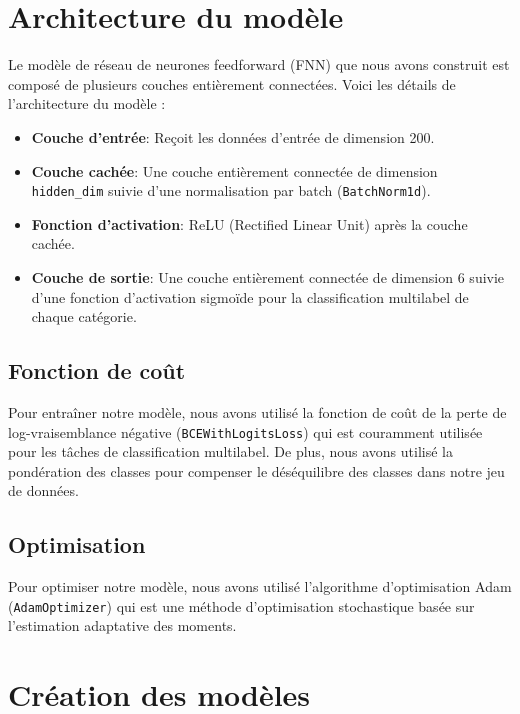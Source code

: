 \section{Architecture du modèle}

Le modèle de réseau de neurones feedforward (FNN) que nous avons construit est composé de plusieurs couches entièrement connectées. Voici les détails de l'architecture du modèle :

\begin{itemize}
    \item \textbf{Couche d'entrée}: Reçoit les données d'entrée de dimension 200.
    \item \textbf{Couche cachée}: Une couche entièrement connectée de dimension \texttt{hidden\_dim} suivie d'une normalisation par batch (\texttt{BatchNorm1d}).
    \item \textbf{Fonction d'activation}: ReLU (Rectified Linear Unit) après la couche cachée.
    \item \textbf{Couche de sortie}: Une couche entièrement connectée de dimension 6 suivie d'une fonction d'activation sigmoïde pour la classification multilabel de chaque catégorie.
\end{itemize}

\subsection{Fonction de coût}

Pour entraîner notre modèle, nous avons utilisé la fonction de coût de la perte de log-vraisemblance négative (\texttt{BCEWithLogitsLoss}) qui est couramment utilisée pour les tâches de classification multilabel.
De plus, nous avons utilisé la pondération des classes pour compenser le déséquilibre des classes dans notre jeu de données.

\subsection{Optimisation}

Pour optimiser notre modèle, nous avons utilisé l'algorithme d'optimisation Adam (\texttt{AdamOptimizer}) qui est une méthode d'optimisation stochastique basée sur l'estimation adaptative des moments.

\section{Création des modèles}

